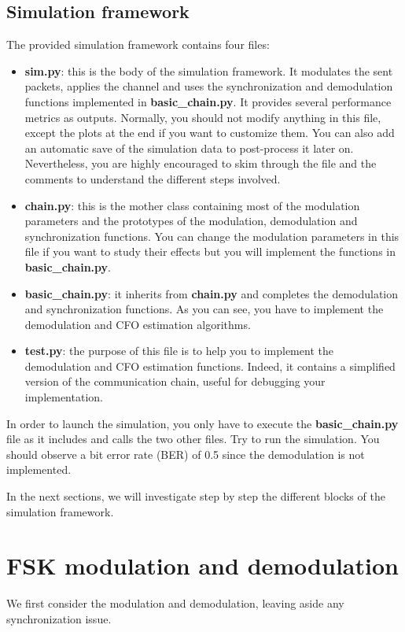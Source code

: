 \subsection{Simulation framework}
The provided simulation framework contains four files:
\begin{itemize}
    \item \textbf{sim.py}: this is the body of the simulation framework. It modulates the sent packets, applies the channel and uses the synchronization and demodulation functions implemented in \textbf{basic\_chain.py}. It provides several performance metrics as outputs. Normally, you should not modify anything in this file, except the plots at the end if you want to customize them. You can also add an automatic save of the simulation data to post-process it later on. Nevertheless, you are highly encouraged to skim through the file and the comments to understand the different steps involved.
    \item \textbf{chain.py}: this is the mother class containing most of the modulation parameters and the prototypes of the modulation, demodulation and synchronization functions. You can change the modulation parameters in this file if you want to study their effects but you will implement the functions in \textbf{basic\_chain.py}.
    \item \textbf{basic\_chain.py}: it inherits from \textbf{chain.py} and completes the demodulation and synchronization functions. As you can see, you have to implement the demodulation and CFO estimation algorithms.
    \item \textbf{test.py}: the purpose of this file is to help you to implement the demodulation and CFO estimation functions. Indeed, it contains a simplified version of the communication chain, useful for debugging your implementation.
\end{itemize}

In order to launch the simulation, you only have to execute the \textbf{basic\_chain.py} file as it includes and calls the two other files. Try to run the simulation. You should observe a bit error rate (BER) of 0.5 since the demodulation is not implemented.

In the next sections, we will investigate step by step the different blocks of the simulation framework.

\section{FSK modulation and demodulation}
We first consider the modulation and demodulation, leaving aside any synchronization issue.

